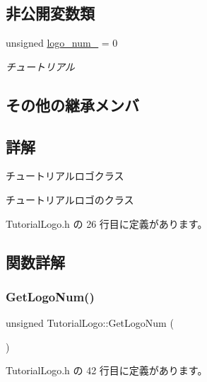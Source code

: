 \subsection*{非公開変数類}
\begin{DoxyCompactItemize}
\item 
unsigned \mbox{\hyperlink{class_tutorial_logo_a8027b42e33a036e88277c4cd17fabdaa}{logo\+\_\+num\+\_\+}} = 0
\begin{DoxyCompactList}\small\item\em チュートリアル \end{DoxyCompactList}\end{DoxyCompactItemize}
\subsection*{その他の継承メンバ}


\subsection{詳解}
チュートリアルロゴクラス 

チュートリアルロゴのクラス 

 Tutorial\+Logo.\+h の 26 行目に定義があります。



\subsection{関数詳解}
\mbox{\label{class_tutorial_logo_af4735bb34e06803ff13ae227fcf74e09}} 
\subsubsection{\texorpdfstring{Get\+Logo\+Num()}{GetLogoNum()}}
{\footnotesize\ttfamily unsigned Tutorial\+Logo\+::\+Get\+Logo\+Num (\begin{DoxyParamCaption}{ }\end{DoxyParamCaption})\hspace{0.3cm}{\ttfamily [inline]}}



 Tutorial\+Logo.\+h の 42 行目に定義があります。

\mbox{\label{class_tutorial_logo_a590f017a6b0532d08c1377b90b8fba3f}} 
